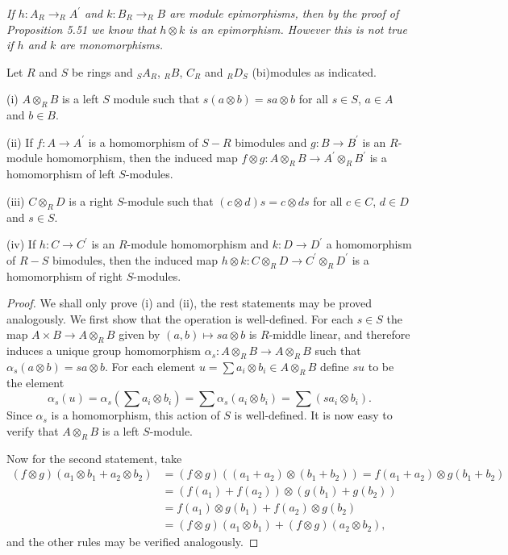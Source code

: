 \begin{note}\em
If $h:A_R\to _RA^\prime$ and $k:B_R\to _RB$ are module epimorphisms, then by the proof of Proposition 5.51 we know that $h\otimes k$ is an epimorphism. However this is not true if $h$ and $k$ are monomorphisms.
\end{note}
\begin{theorem}
Let $R$ and $S$ be rings and $_SA_R$, $_RB$, $C_R$ and $_RD_S$ (bi)modules as indicated.\par
(i) $A\otimes_RB$ is a left $S$ module such that $s(a\otimes b)=sa\otimes b$ for all $s\in S$, $a\in A$ and $b\in B$.\par
(ii) If $f:A\to A^\prime$ is a homomorphism of $S-R$ bimodules and $g:B\to B^\prime$ is an $R$-module homomorphism, then the induced map $f\otimes g:A\otimes_RB\to A^\prime\otimes_RB^\prime$ is a homomorphism of left $S$-modules.\par
(iii) $C\otimes_RD$ is a right $S$-module such that $(c\otimes d)s=c\otimes ds$ for all $c\in C$, $d\in D$ and $s\in S$.\par
(iv) If $h:C\to C^\prime$ is an $R$-module homomorphism and $k:D\to D^\prime$ a homomorphism of $R-S$ bimodules, then the induced map $h\otimes k:C\otimes_RD\to C^\prime\otimes_RD^\prime$ is a homomorphism of right $S$-modules.
\end{theorem}
\begin{proof}
We shall only prove (i) and (ii), the rest statements may be proved analogously. We first show that the operation is well-defined. For each $s\in S$ the map $A\times B\to A\otimes_RB$ given by $(a,b)\mapsto sa\otimes b$ is $R$-middle linear, and therefore induces a unique group homomorphism $\alpha_s:A\otimes_RB\to A\otimes_RB$ such that $\alpha_s(a\otimes b)=sa\otimes b$. For each element $u=\sum a_i\otimes b_i\in A\otimes_RB$ define $su$ to be the element 
$$
\alpha _s\left( u \right) =\alpha _s\left( \sum{a_i\otimes b_i} \right) =\sum{\alpha _s\left( a_i\otimes b_i \right)}=\sum{\left( sa_i\otimes b_i \right)}.
$$
Since $\alpha_s$ is a homomorphism, this action of $S$ is well-defined. It is now easy to verify that $A\otimes_RB$ is a left $S$-module.\par
Now for the second statement, take 
$$
\begin{aligned}
\left( f\otimes g \right) \left( a_1\otimes b_1+a_2\otimes b_2 \right) &=\left( f\otimes g \right) \left( \left( a_1+a_2 \right) \otimes \left( b_1+b_2 \right) \right) =f\left( a_1+a_2 \right) \otimes g\left( b_1+b_2 \right) 
\\
&=\left( f\left( a_1 \right) +f\left( a_2 \right) \right) \otimes \left( g\left( b_1 \right) +g\left( b_2 \right) \right) 
\\
&=f\left( a_1 \right) \otimes g\left( b_1 \right) +f\left( a_2 \right) \otimes g\left( b_2 \right) 
\\
&=\left( f\otimes g \right) \left( a_1\otimes b_1 \right) +\left( f\otimes g \right) \left( a_2\otimes b_2 \right) ,
\end{aligned}
$$
and the other rules may be verified analogously.
\end{proof}
